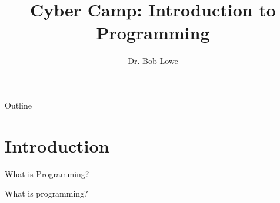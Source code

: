 \documentclass[handout]{beamer}
\title{Cyber Camp: Introduction to Programming}
\author{Dr. Bob Lowe}
\institute[Southeast Missouri State University] %
{
  Department of Computer Science\\
  Southeast Missouri State University
}
\date[]{}
\begin{document}
\begin{frame}
  \titlepage
\end{frame}

\begin{frame}{Outline}
  \tableofcontents
\end{frame}





\section{Introduction}

\begin{frame}{What is Programming?}
    \begin{center}
        {\huge What is programming?}
    \end{center}
\end{frame}
\end{document}
